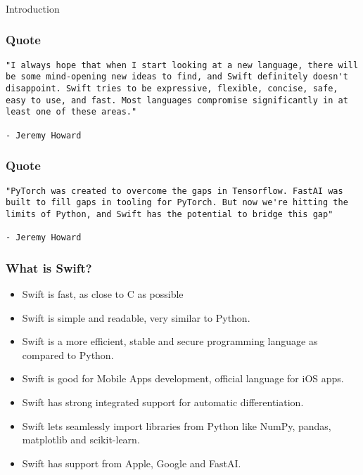 \begin{frame}[fragile]\frametitle{}
\begin{center}
{\Large Introduction}
\end{center}
\end{frame}


\begin{frame}[fragile]\frametitle{Quote}
\begin{lstlisting}
"I always hope that when I start looking at a new language, there will be some mind-opening new ideas to find, and Swift definitely doesn't disappoint. Swift tries to be expressive, flexible, concise, safe, easy to use, and fast. Most languages compromise significantly in at least one of these areas."

- Jeremy Howard
\end{lstlisting}
\end{frame}

\begin{frame}[fragile]\frametitle{Quote}
\begin{lstlisting}
"PyTorch was created to overcome the gaps in Tensorflow. FastAI was built to fill gaps in tooling for PyTorch. But now we're hitting the limits of Python, and Swift has the potential to bridge this gap"

- Jeremy Howard
\end{lstlisting}
\end{frame}

\begin{frame} \frametitle{What is Swift?}
\begin{itemize}
\item Swift is fast, as close to C as possible
\item Swift is simple and readable, very similar to Python. 
\item Swift is a more efficient, stable and secure programming language as compared to Python.
\item Swift is good for Mobile Apps development, official language for iOS apps.
\item Swift has strong integrated support for automatic differentiation.
\item Swift lets seamlessly import libraries from Python like NumPy, pandas, matplotlib and scikit-learn. 
\item Swift has support from Apple, Google and FastAI.
\end{itemize}
\end{frame}

